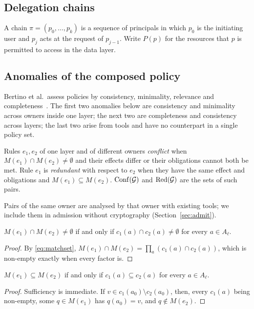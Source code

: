 \subsection{Delegation chains}
A chain $\pi = (p_0, \dots, p_k)$ is a sequence of principals in which $p_0$ is the initiating user and $p_j$ acts at the request of $p_{j-1}$. Write $P(p)$ for the resources that $p$ is permitted to access in the data layer.

\subsection{Anomalies of the composed policy}\label{sec:anomalies}
Bertino et al.\ assess policies by consistency, minimality, relevance and completeness~\cite{bertino2018quality}. The first two anomalies below are consistency and minimality across owners inside one layer; the next two are completeness and consistency across layers; the last two arise from tools and have no counterpart in a single policy set.

\begin{definition}\label{def:pair}
Rules $e_1, e_2$ of one layer and of different owners \emph{conflict} when $M(e_1) \cap M(e_2) \neq \emptyset$ and their effects differ or their obligations cannot both be met. Rule $e_1$ is \emph{redundant} with respect to $e_2$ when they have the same effect and obligations and $M(e_1) \subseteq M(e_2)$. $\mathrm{Conf}(\mathcal{G})$ and $\mathrm{Red}(\mathcal{G})$ are the sets of such pairs.
\end{definition}
Pairs of the same owner are analysed by that owner with existing tools; we include them in admission without cryptography (Section~\ref{sec:admit}).

\begin{lemma}[Overlap]\label{lem:overlap}
$M(e_1) \cap M(e_2) \neq \emptyset$ if and only if $c_1(a) \cap c_2(a) \neq \emptyset$ for every $a \in A_\ell$.
\end{lemma}
\begin{proof}
By \eqref{eq:matchset}, $M(e_1) \cap M(e_2) = \prod_a (c_1(a) \cap c_2(a))$, which is non-empty exactly when every factor is.
\end{proof}

\begin{lemma}[Subsumption]\label{lem:subsume}
$M(e_1) \subseteq M(e_2)$ if and only if $c_1(a) \subseteq c_2(a)$ for every $a \in A_\ell$.
\end{lemma}
\begin{proof}
Sufficiency is immediate. If $v \in c_1(a_0) \setminus c_2(a_0)$, then, every $c_1(a)$ being non-empty, some $q \in M(e_1)$ has $q(a_0) = v$, and $q \notin M(e_2)$.
\end{proof}

